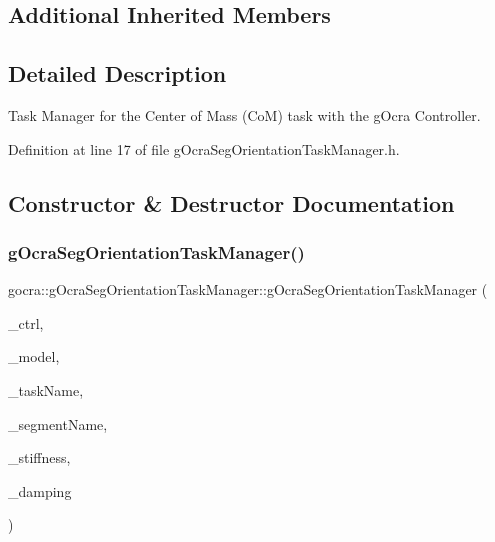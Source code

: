 \subsection*{Additional Inherited Members}


\subsection{Detailed Description}
Task Manager for the Center of Mass (CoM) task with the g\+Ocra Controller. 



Definition at line 17 of file g\+Ocra\+Seg\+Orientation\+Task\+Manager.\+h.



\subsection{Constructor \& Destructor Documentation}
\hypertarget{classgocra_1_1gOcraSegOrientationTaskManager_a4d14922b755ae527247c7c82b1c99cdb}{}\label{classgocra_1_1gOcraSegOrientationTaskManager_a4d14922b755ae527247c7c82b1c99cdb} 
\subsubsection{\texorpdfstring{g\+Ocra\+Seg\+Orientation\+Task\+Manager()}{gOcraSegOrientationTaskManager()}\hspace{0.1cm}{\footnotesize\ttfamily [1/2]}}
{\footnotesize\ttfamily gocra\+::g\+Ocra\+Seg\+Orientation\+Task\+Manager\+::g\+Ocra\+Seg\+Orientation\+Task\+Manager (\begin{DoxyParamCaption}\item[{\hyperlink{classgocra_1_1GHCJTController}{G\+H\+C\+J\+T\+Controller} \&}]{\+\_\+ctrl,  }\item[{const ocra\+::\+Model \&}]{\+\_\+model,  }\item[{const std\+::string \&}]{\+\_\+task\+Name,  }\item[{const std\+::string \&}]{\+\_\+segment\+Name,  }\item[{double}]{\+\_\+stiffness,  }\item[{double}]{\+\_\+damping }\end{DoxyParamCaption})}

